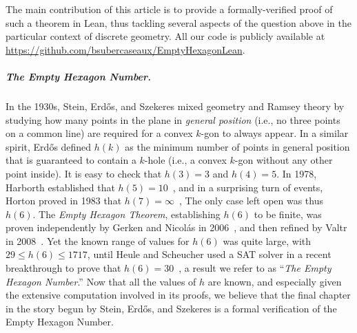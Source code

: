 % 

The main contribution of this article is to provide a formally-verified proof of such a theorem in Lean, thus tackling several aspects of the question above in the particular context of discrete geometry.
All our code is publicly available at \url{https://github.com/bsubercaseaux/EmptyHexagonLean}.
\subparagraph*{The Empty Hexagon Number.}
In the 1930s, Stein, Erd\H{o}s, and Szekeres mixed geometry and Ramsey theory by studying how many points in the plane in \emph{general position} (i.e., no three points on a common line) are required for a convex $k$-gon to always appear. 
In a similar spirit, Erd\H{o}s defined $h(k)$ as the minimum number of points in general position that is guaranteed to contain a $k$-hole (i.e., a convex $k$-gon without any other point inside).
It is easy to check that $h(3) = 3$ and $h(4) = 5$. In 1978, Harborth established that $h(5) = 10$~\cite{Harborth1978}, and in a surprising turn of events, Horton proved in 1983 that $h(7) = \infty$~\cite{hortonSetsNoEmpty1983}, 
The only case left open was thus $h(6)$.
The \emph{Empty Hexagon Theorem}, establishing $h(6)$ to be finite, was proven independently by Gerken and Nicolás in 2006~\cite{gerkenEmptyConvexHexagons2008,nicolasEmptyHexagonTheorem2007}, and then refined by Valtr in 2008~\cite{valtr}.
Yet the known range of values for $h(6)$ was quite large, with $29 \leq h(6) \leq 1717$, until Heule and Scheucher used a SAT solver in a recent breakthrough to prove that $h(6) = 30$~\cite{emptyHexagonNumber}, a result we refer to as ``\emph{The Empty Hexagon Number}.''
Now that all the values of $h$ are known, and especially given the extensive computation involved in its proofs, we believe that the final chapter in the story begun by Stein, Erd\H{o}s, and Szekeres is a formal verification of the Empty Hexagon Number.

